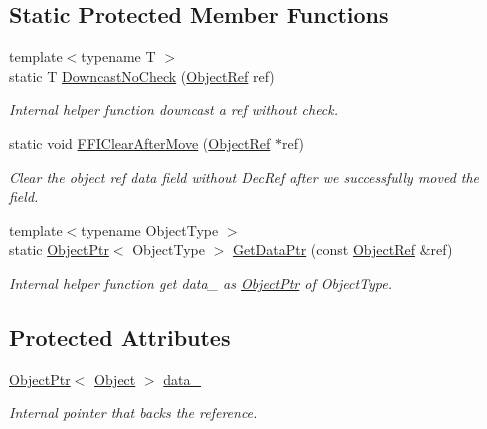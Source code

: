 \subsection*{Static Protected Member Functions}
\begin{DoxyCompactItemize}
\item 
{\footnotesize template$<$typename T $>$ }\\static T \hyperlink{classtvm_1_1runtime_1_1ObjectRef_acd04bb22a6861e9952c344ee8547411f}{Downcast\+No\+Check} (\hyperlink{classtvm_1_1runtime_1_1ObjectRef}{Object\+Ref} ref)
\begin{DoxyCompactList}\small\item\em Internal helper function downcast a ref without check. \end{DoxyCompactList}\item 
static void \hyperlink{classtvm_1_1runtime_1_1ObjectRef_a22e5bb9d64dbc773bb9263b70882239e}{F\+F\+I\+Clear\+After\+Move} (\hyperlink{classtvm_1_1runtime_1_1ObjectRef}{Object\+Ref} $\ast$ref)
\begin{DoxyCompactList}\small\item\em Clear the object ref data field without Dec\+Ref after we successfully moved the field. \end{DoxyCompactList}\item 
{\footnotesize template$<$typename Object\+Type $>$ }\\static \hyperlink{classtvm_1_1runtime_1_1ObjectPtr}{Object\+Ptr}$<$ Object\+Type $>$ \hyperlink{classtvm_1_1runtime_1_1ObjectRef_aed593996e4076632450de8fde776707c}{Get\+Data\+Ptr} (const \hyperlink{classtvm_1_1runtime_1_1ObjectRef}{Object\+Ref} \&ref)
\begin{DoxyCompactList}\small\item\em Internal helper function get data\+\_\+ as \hyperlink{classtvm_1_1runtime_1_1ObjectPtr}{Object\+Ptr} of Object\+Type. \end{DoxyCompactList}\end{DoxyCompactItemize}
\subsection*{Protected Attributes}
\begin{DoxyCompactItemize}
\item 
\hyperlink{classtvm_1_1runtime_1_1ObjectPtr}{Object\+Ptr}$<$ \hyperlink{classtvm_1_1runtime_1_1Object}{Object} $>$ \hyperlink{classtvm_1_1runtime_1_1ObjectRef_ac261cdb80487fb29ac42b28678f8cbef}{data\+\_\+}
\begin{DoxyCompactList}\small\item\em Internal pointer that backs the reference. \end{DoxyCompactList}\end{DoxyCompactItemize}
